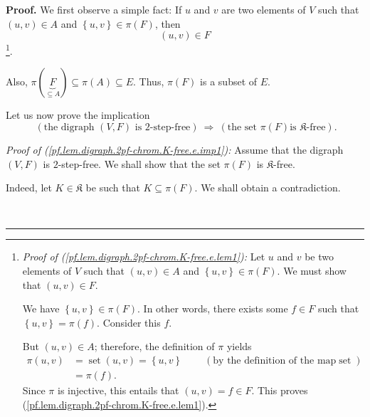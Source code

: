\documentclass[numbers=enddot,12pt,final,onecolumn,notitlepage]{scrartcl}%
\theoremstyle{definition}
\newenvironment{proof}[1][Proof]{\noindent\textbf{#1.} }{\ \rule{0.5em}{0.5em}}
\newenvironment{verlong}{}{}
\begin{document}
\begin{verlong}
\begin{proof}
We first observe a simple fact: If $u$ and $v$ are two elements of $V$ such
that $\left(  u,v\right)  \in A$ and $\left\{  u,v\right\}  \in\pi\left(
F\right)  $, then%
\begin{equation}
\left(  u,v\right)  \in F \label{pf.lem.digraph.2pf-chrom.K-free.e.lem1}%
\end{equation}
\footnote{\textit{Proof of (\ref{pf.lem.digraph.2pf-chrom.K-free.e.lem1}):}
Let $u$ and $v$ be two elements of $V$ such that $\left(  u,v\right)  \in A$
and $\left\{  u,v\right\}  \in\pi\left(  F\right)  $. We must show that
$\left(  u,v\right)  \in F$.
\par
We have $\left\{  u,v\right\}  \in\pi\left(  F\right)  $. In other words,
there exists some $f\in F$ such that $\left\{  u,v\right\}  =\pi\left(
f\right)  $. Consider this $f$.
\par
But $\left(  u,v\right)  \in A$; therefore, the definition of $\pi$ yields%
\begin{align*}
\pi\left(  u,v\right)   &  =\operatorname*{set}\left(  u,v\right)  =\left\{
u,v\right\}  \ \ \ \ \ \ \ \ \ \ \left(  \text{by the definition of the map
}\operatorname*{set}\right) \\
&  =\pi\left(  f\right)  .
\end{align*}
Since $\pi$ is injective, this entails that $\left(  u,v\right)  =f\in F$.
This proves (\ref{pf.lem.digraph.2pf-chrom.K-free.e.lem1}).}.

Also, $\pi\left(  \underbrace{F}_{\subseteq A}\right)  \subseteq\pi\left(
A\right)  \subseteq E$. Thus, $\pi\left(  F\right)  $ is a subset of $E$.

Let us now prove the implication%
\begin{equation}
\ \left(  \text{the digraph }\left(  V,F\right)  \text{ is }2\text{-step-free}%
\right)  \ \Longrightarrow\ \left(  \text{the set }\pi\left(  F\right)  \text{
is }\mathfrak{K}\text{-free}\right)  .
\label{pf.lem.digraph.2pf-chrom.K-free.e.imp1}%
\end{equation}


\textit{Proof of (\ref{pf.lem.digraph.2pf-chrom.K-free.e.imp1}):} Assume that
the digraph $\left(  V,F\right)  $ is $2$-step-free. We shall show that the
set $\pi\left(  F\right)  $ is $\mathfrak{K}$-free.

Indeed, let $K\in\mathfrak{K}$ be such that $K\subseteq\pi\left(  F\right)  $.
We shall obtain a contradiction.


\end{proof}
\end{verlong}
\end{document}
